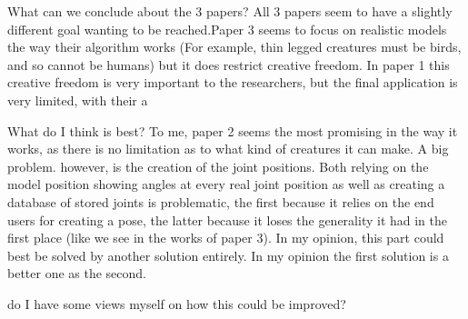 \documentclass{article}
\begin{document}
What can we conclude about the 3 papers?  All 3 papers seem to have a slightly
different goal wanting to be reached.Paper 3 seems to focus on realistic models
the way their algorithm works (For example, thin legged creatures must be birds,
and so cannot be humans) but it does restrict creative freedom. In paper 1 this
creative freedom is very important to the researchers, but the final application
is very limited, with their a

What do I think is best?
To me, paper 2 seems the most promising in the way it works, as there is no
limitation as to what kind of creatures it can make. A big problem. however, is
the creation of the joint positions. Both relying on the model position showing
angles at every real joint position as well as creating a database of stored
joints is problematic, the first because it relies on the end users for creating
a pose, the latter because it loses the generality it had in the first place
(like we see in the works of paper 3). In my opinion, this part could best be
solved by another solution entirely. In my opinion the first solution is a
better one as the second.

do I have some views myself on how this could be improved?



\end{document}
